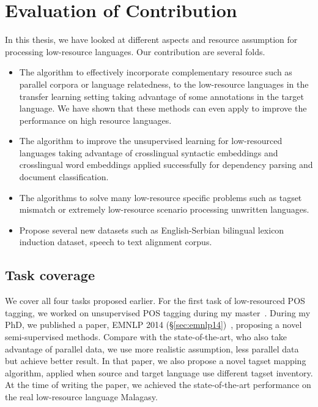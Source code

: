 \documentclass[12pt,twoside,final,hidelinks]{ltthesis}
\theoremstyle{definition}
\newcommand\emnlpiv{EMNLP 2014 (\S\ref{sec:emnlp14})}
\begin{document}
\section{Evaluation of Contribution}
\label{sec:evaluation_contribution}
In this thesis, we have looked at different aspects and resource assumption for processing low-resource languages. Our contribution are several folds. 
\begin{itemize}
\item The algorithm to effectively incorporate complementary resource such as parallel corpora or language relatedness, to the low-resource languages 
in the transfer learning setting taking advantage of some annotations in the target language. We have shown that these methods can even apply to improve 
the performance on high resource languages. 
\item The algorithm to improve the unsupervised learning for low-resourced languages taking advantage of crosslingual syntactic embeddings and crosslingual 
word embeddings applied successfully for dependency parsing and document classification. 
\item The algorithms to solve many low-resource specific problems such as tagset mismatch or extremely low-resource scenario processing unwritten languages.
\item Propose several new datasets such as English-Serbian bilingual lexicon induction dataset, speech to text alignment corpus. 
\end{itemize}

\subsection{Task coverage}
We cover all four tasks proposed earlier. For the first task of low-resourced POS tagging, we worked on unsupervised POS tagging during my master~\cite{duongIJCNLP,Duongacl13}. During my PhD, we published a paper, \emnlpiv\ , proposing a novel semi-supervised methods. Compare with 
the state-of-the-art, who also take advantage of parallel data, we use more realistic assumption, less parallel data but achieve better result. 
In that paper, we also propose a novel tagset mapping algorithm, applied when source and target language use different tagset inventory. At the 
time of writing the paper, we achieved the state-of-the-art performance on the real low-resource language Malagasy. 
\end{document}
